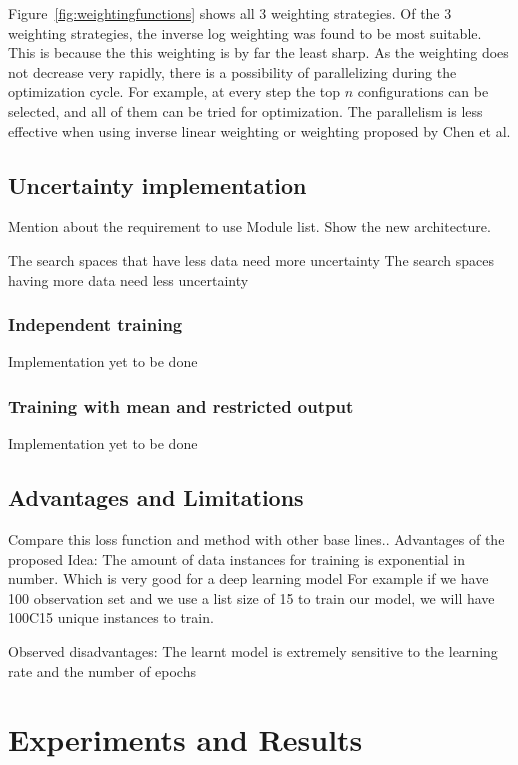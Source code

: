 \documentclass[11pt]{report}
\begin{document}
Figure~\ref{fig:weightingfunctions} shows all 3 weighting strategies.
Of the 3 weighting strategies,  the inverse log weighting was found to be most suitable.
This is because the this weighting is by far the least sharp.
As the weighting does not decrease very rapidly,  there is a possibility of parallelizing during the optimization cycle.
For example,  at every step the top $n$ configurations can be selected,  and all of them can be tried for optimization.
The parallelism is less effective when using inverse linear weighting or weighting proposed by Chen et al.

\section{Uncertainty implementation}
Mention about the requirement to use Module list.
Show the new architecture.

The search spaces that have less data need more uncertainty
The search spaces having more data need less uncertainty


\subsection{Independent training}
Implementation yet to be done


\subsection{Training with mean and restricted output}
Implementation yet to be done


\section{Advantages and Limitations}
Compare this loss function and method with other base lines..
Advantages of the proposed Idea:
    The amount of data instances for training is exponential in number. Which is very good for a deep learning model
    For example if we have 100 observation set and we use a list size of 15 to train our model, we will have 100C15
    unique instances to train.

Observed disadvantages:
    The learnt model is extremely sensitive to the learning rate and the number of epochs
    

\chapter{Experiments and Results}
\end{document}
